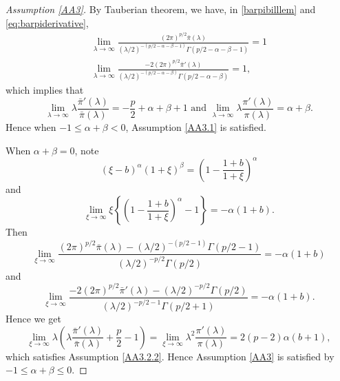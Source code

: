 \documentclass[preprint,11pt]{imsart}
\numberwithin{equation}{section}
\theoremstyle{plain}
\theoremstyle{definition}
\theoremstyle{remark}
\begin{document}
\begin{proof}
[Assumption \ref{AA3}]
By Tauberian theorem, we have, in \eqref{barpibilllem} and \eqref{eq:barpiderivative},
\begin{equation}\label{eq:tau.2}
 \begin{split}
\lim_{\lambda\to \infty}\frac{(2\pi)^{p/2}\bar{\pi}(\lambda)}{(\lambda/2)^{-(p/2-\alpha-\beta-1)}\Gamma(p/2-\alpha-\beta-1)}=1 \\
\lim_{\lambda\to \infty}\frac{-2(2\pi)^{p/2}\bar{\pi}'(\lambda)}{(\lambda/2)^{-(p/2-\alpha-\beta)}\Gamma(p/2-\alpha-\beta)}=1,
\end{split}
\end{equation}
which implies that
\begin{equation}\label{eq:tau.3}
 \lim_{\lambda\to \infty}\lambda\frac{\bar{\pi}'(\lambda)}{\bar{\pi}(\lambda)}=-\frac{p}{2}+\alpha+\beta+1\text{ and }
\lim_{\lambda\to \infty}\lambda\frac{\pi'(\lambda)}{\pi(\lambda)}=\alpha+\beta.
\end{equation}
Hence when $-1\leq \alpha+\beta<0$, Assumption \ref{AA3.1} is satisfied.

When $\alpha+\beta=0$, note 
\begin{equation*}
 (\xi-b)^\alpha(1+\xi)^\beta=
  \left(1-\frac{1+b}{1+\xi}\right)^\alpha
\end{equation*}
and
\begin{equation*}
 \lim_{\xi\to\infty}\xi\left\{\left(1-\frac{1+b}{1+\xi}\right)^\alpha-1\right\}=-\alpha(1+b).
\end{equation*}
Then
\begin{equation*}
 \lim_{\xi\to\infty}
  \frac{(2\pi)^{p/2}\bar{\pi}(\lambda)-(\lambda/2)^{-(p/2-1)}\Gamma(p/2-1)}
  {(\lambda/2)^{-p/2}\Gamma(p/2)}=-\alpha(1+b)
\end{equation*}
and
\begin{equation*}
 \lim_{\xi\to\infty}
  \frac{-2(2\pi)^{p/2}\bar{\pi}'(\lambda)-(\lambda/2)^{-p/2}\Gamma(p/2)}
  {(\lambda/2)^{-p/2-1}\Gamma(p/2+1)}=-\alpha(1+b).
\end{equation*}
Hence we get
\begin{equation*}
 \lim_{\xi\to\infty}\lambda\left(\lambda\frac{\bar{\pi}'(\lambda)}{\bar{\pi}(\lambda)}+\frac{p}{2}-1\right)
=\lim_{\xi\to\infty}\lambda^2\frac{\pi'(\lambda)}{\pi(\lambda)}  =2(p-2)\alpha(b+1),
\end{equation*}
which satisfies Assumption \ref{AA3.2.2}.
Hence Assumption \ref{AA3} is satisfied by $-1\leq \alpha+\beta\leq 0$.
\end{proof}
\end{document}
